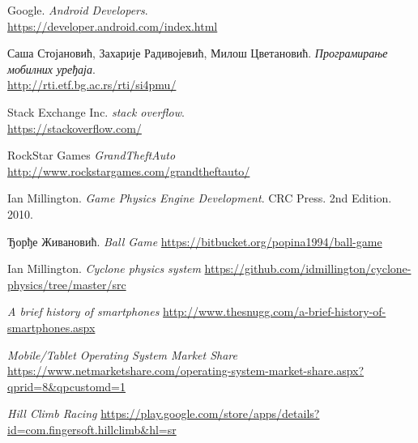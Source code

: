 \begin{thebibliography}{refs}
		Google.
		\emph{Android Developers}.\\
		\url{https://developer.android.com/index.html}
		
		Саша Стојановић, Захарије Радивојевић, Милош Цветановић.
		\emph{Програмирање мобилних уређаја}.\\
		\url{http://rti.etf.bg.ac.rs/rti/si4pmu/}
		
		Stack Exchange Inc.
		\emph{stack overflow}.\\
		\url{https://stackoverflow.com/}
		
		RockStar Games 
		\emph{GrandTheftAuto}
		\url{http://www.rockstargames.com/grandtheftauto/}
		
		Ian Millington. 
		\emph{Game Physics Engine Development}.
		CRC Press.
		2nd Edition. 2010.
		
		Ђорђе Живановић.
		\emph{Ball Game}
		\url{https://bitbucket.org/popina1994/ball-game}
		
		
		Ian Millington. 
		\emph{Cyclone physics system}
		\url{https://github.com/idmillington/cyclone-physics/tree/master/src}
		
		\emph{A brief history of smartphones}
		\url{http://www.thesnugg.com/a-brief-history-of-smartphones.aspx}
		
		\emph{Mobile/Tablet Operating System Market Share}
		\url{https://www.netmarketshare.com/operating-system-market-share.aspx?qprid=8&qpcustomd=1}
		
		\emph{Hill Climb Racing}
		\url{https://play.google.com/store/apps/details?id=com.fingersoft.hillclimb&hl=sr}
		
		
		
		
		


\end{thebibliography}